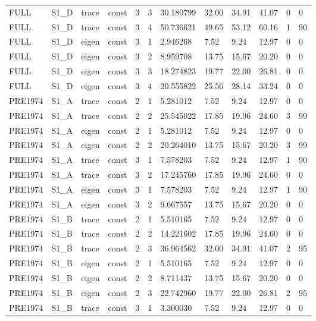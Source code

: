 \begin{tabular}{llllllllllll}
FULL & S1\_D & trace & const & 3 & 3 & 30.180799 & 32.00 & 34.91 & 41.07 & 0 & 0 \\
FULL & S1\_D & trace & const & 3 & 4 & 50.736621 & 49.65 & 53.12 & 60.16 & 1 & 90 \\
FULL & S1\_D & eigen & const & 3 & 1 & 2.946268 & 7.52 & 9.24 & 12.97 & 0 & 0 \\
FULL & S1\_D & eigen & const & 3 & 2 & 8.959708 & 13.75 & 15.67 & 20.20 & 0 & 0 \\
FULL & S1\_D & eigen & const & 3 & 3 & 18.274823 & 19.77 & 22.00 & 26.81 & 0 & 0 \\
FULL & S1\_D & eigen & const & 3 & 4 & 20.555822 & 25.56 & 28.14 & 33.24 & 0 & 0 \\
PRE1974 & S1\_A & trace & const & 2 & 1 & 5.281012 & 7.52 & 9.24 & 12.97 & 0 & 0 \\
PRE1974 & S1\_A & trace & const & 2 & 2 & 25.545022 & 17.85 & 19.96 & 24.60 & 3 & 99 \\
PRE1974 & S1\_A & eigen & const & 2 & 1 & 5.281012 & 7.52 & 9.24 & 12.97 & 0 & 0 \\
PRE1974 & S1\_A & eigen & const & 2 & 2 & 20.264010 & 13.75 & 15.67 & 20.20 & 3 & 99 \\
PRE1974 & S1\_A & trace & const & 3 & 1 & 7.578203 & 7.52 & 9.24 & 12.97 & 1 & 90 \\
PRE1974 & S1\_A & trace & const & 3 & 2 & 17.245760 & 17.85 & 19.96 & 24.60 & 0 & 0 \\
PRE1974 & S1\_A & eigen & const & 3 & 1 & 7.578203 & 7.52 & 9.24 & 12.97 & 1 & 90 \\
PRE1974 & S1\_A & eigen & const & 3 & 2 & 9.667557 & 13.75 & 15.67 & 20.20 & 0 & 0 \\
PRE1974 & S1\_B & trace & const & 2 & 1 & 5.510165 & 7.52 & 9.24 & 12.97 & 0 & 0 \\
PRE1974 & S1\_B & trace & const & 2 & 2 & 14.221602 & 17.85 & 19.96 & 24.60 & 0 & 0 \\
PRE1974 & S1\_B & trace & const & 2 & 3 & 36.964562 & 32.00 & 34.91 & 41.07 & 2 & 95 \\
PRE1974 & S1\_B & eigen & const & 2 & 1 & 5.510165 & 7.52 & 9.24 & 12.97 & 0 & 0 \\
PRE1974 & S1\_B & eigen & const & 2 & 2 & 8.711437 & 13.75 & 15.67 & 20.20 & 0 & 0 \\
PRE1974 & S1\_B & eigen & const & 2 & 3 & 22.742960 & 19.77 & 22.00 & 26.81 & 2 & 95 \\
PRE1974 & S1\_B & trace & const & 3 & 1 & 3.300030 & 7.52 & 9.24 & 12.97 & 0 & 0 \\

\end{tabular}
